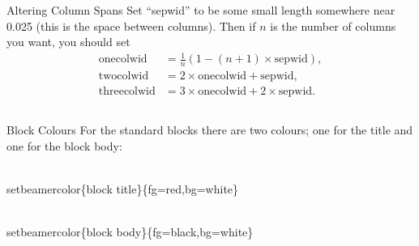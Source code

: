 \documentclass[final]{beamer}
\newlength{\sepwid}
\newlength{\onecolwid}
\newlength{\twocolwid}
\newlength{\threecolwid}
\begin{document}
\begin{frame}[t]
\begin{columns}[t]
\begin{column}{0.475\paperwidth}
\begin{block}{Altering Column Spans}
        Set ``sepwid'' to be some small length somewhere near 0.025 (this is the space between columns). Then if $n$ is the number of columns you want, you should set
        \begin{align*}
          \text{onecolwid} & = \frac{1}{n}(1-(n+1)\times\text{sepwid}), \\
          \text{twocolwid} & = 2\times\text{onecolwid} + \text{sepwid}, \\
          \text{threecolwid} & = 3\times\text{onecolwid} + 2\times\text{sepwid}.
        \end{align*}
      \end{block}
      \begin{columns}[t,totalwidth=\twocolwid]	%
        \begin{column}{\onecolwid}
          \begin{block}{Block Colours}
            For the standard blocks there are two colours; one for the title and one for the block body:\\
            \begin{semiverbatim}
              {\color{red}\\setbeamercolor}\{block title\}\newline \{fg=red,bg=white\}
            \end{semiverbatim}
            \begin{semiverbatim}
              {\color{red}\\setbeamercolor}\{block  body\}\newline \{fg=black,bg=white\}
            \end{semiverbatim}
          \end{block}
        \end{column}

\end{columns}
\end{column}
\end{columns}
\end{frame}
\end{document}
